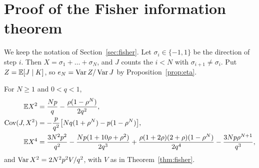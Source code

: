 \section{Proof of the Fisher information theorem}\label{app:fisher}

We keep the notation of Section~\ref{sec:fisher}. Let
$\sigma_i\in\{-1,1\}$ be the direction of step $i$. Then
$X=\sigma_1+\dots+\sigma_N$, and $J$ counts the $i<N$ with
$\sigma_{i+1}\ne\sigma_i$. Put $Z=\mathbb E[J\mid K]$, so $e_N=\operatorname{Var} Z/\operatorname{Var} J$
by Proposition~\ref{prop:eta}.

\begin{lemma}\label{lem:fisher-moments}
For $N\ge1$ and $0<q<1$,
\begin{align*}
 \mathbb E X^2&=\frac{Np}q-\frac{\rho(1-\rho^N)}{2q^2},\\
 \operatorname{Cov}(J,X^2)&=-\frac p{q^2}\bigl[Nq(1+\rho^N)-p(1-\rho^N)\bigr],\\
 \mathbb E X^4&=\frac{3N^2p^2}{q^2}-\frac{Np(1+10\rho+\rho^2)}{2q^3}
 +\frac{\rho(1+2\rho)(2+\rho)(1-\rho^N)}{2q^4}
 -\frac{3Np\rho^{N+1}}{q^3},
\end{align*}
and $\operatorname{Var} X^2=2N^2p^2V/q^2$, with $V$ as in Theorem~\ref{thm:fisher}.
\end{lemma}

